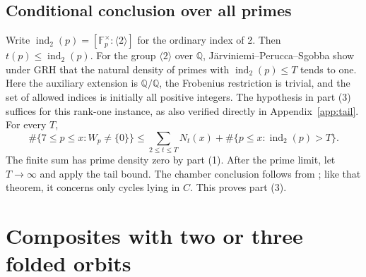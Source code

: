 \documentclass[11pt,reqno]{amsart}
\newcommand{\Q}{\mathbb Q}
\newcommand{\F}{\mathbb F}
\begin{document}
\subsection*{Conditional conclusion over all primes}
Write \(\operatorname{ind}_2(p)=[\F_p^\times:\langle2\rangle]\) for the ordinary index of 2. Then \(t(p)\le\operatorname{ind}_2(p)\). For the group \(\langle2\rangle\) over \(\Q\), J\"arviniemi--Perucca--Sgobba \cite[Theorem~8 and Proposition~9]{JPS} show under GRH that the natural density of primes with \(\operatorname{ind}_2(p)\le T\) tends to one. Here the auxiliary extension is \(\Q/\Q\), the Frobenius restriction is trivial, and the set of allowed indices is initially all positive integers. The hypothesis in part (3) suffices for this rank-one instance, as also verified directly in Appendix~\ref{app:tail}. For every \(T\),
\[
 \#\{7\le p\le x:W_p\ne\{0\}\}\le
       \sum_{2\le t\le T}N_t(x)+\#\{p\le x:\operatorname{ind}_2(p)>T\}.
\]
The finite sum has prime density zero by part (1). After the prime limit, let \(T\to\infty\) and apply the tail bound. The chamber conclusion follows from \cite[Theorem~1]{G10}; like that theorem, it concerns only cycles lying in \(C\). This proves part (3).

\section{Composites with two or three folded orbits}\label{sec:comp}
\end{document}
